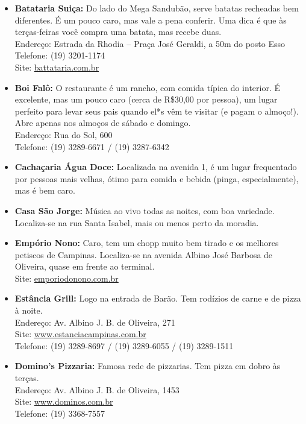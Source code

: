\begin{itemize}
    \item   \textbf{Batataria Suiça:} Do lado do Mega Sandubão, serve batatas
        recheadas bem diferentes. É um pouco caro, mas vale a pena conferir. Uma
        dica é que às terças-feiras você compra uma batata, mas recebe duas.
        \\Endereço: Estrada da Rhodia -- Praça José Geraldi, a 50m do posto Esso
        \\Telefone: (19) 3201-1174
        \\Site: \url{battataria.com.br}

    \item   \textbf{Boi Falô:} O restaurante é um rancho, com comida típica do
        interior. É excelente, mas um pouco caro (cerca de R\$30,00 por pessoa),
        um lugar perfeito para levar seus pais quando el*s vêm te visitar (e
        pagam o almoço!). Abre apenas nos almoços de sábado e domingo.
        \\Endereço: Rua do Sol, 600
        \\Telefone: (19) 3289-6671 / (19) 3287-6342%

    \item   \textbf{Cachaçaria Água Doce:} Localizada na avenida 1, é um lugar
        frequentado por pessoas mais velhas, ótimo para comida e bebida (pinga,
        especialmente), mas é bem caro.

    \item   \textbf{Casa São Jorge:} Música ao vivo todas as noites, com boa
        variedade. Localiza-se na rua Santa Isabel, mais ou menos perto da
        moradia.

    \item   \textbf{Empório Nono:} Caro, tem um chopp muito bem tirado e os
        melhores petiscos de Campinas. Localiza-se na avenida Albino José
        Barbosa de Oliveira, quase em frente ao terminal.
        \\Site: \url{emporiodonono.com.br}

    \item   \textbf{Estância Grill:} Logo na entrada de Barão. Tem rodízios de
        carne e de pizza à noite.
        \\Endereço: Av. Albino J. B. de Oliveira, 271
        \\Site: \url{www.estanciacampinas.com.br}
        \\Telefone: (19) 3289-8697 / (19) 3289-6055 / (19) 3289-1511

    \item   \textbf{Domino's Pizzaria:} Famosa rede de pizzarias. Tem pizza
        em dobro às terças.
        \\Endereço: Av. Albino J. B. de Oliveira, 1453
        \\Site: \url{www.dominos.com.br}
        \\Telefone: (19) 3368-7557


\end{itemize}
